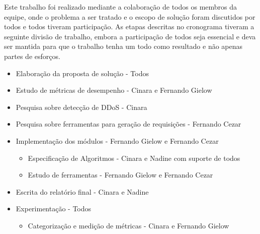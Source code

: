
Este trabalho foi realizado mediante a colaboração de todos os membros da equipe, onde o problema a ser tratado e o escopo de solução foram discutidos por todos e todos tiveram participação. As etapas descritas no cronograma tiveram a seguinte divisão de trabalho, embora a participação de todos seja essencial e deva ser mantida para que o trabalho tenha um todo como resultado e não apenas partes de esforços.


\begin{itemize}
\item Elaboração da proposta de solução - Todos
\item Estudo de métricas de desempenho - Cinara e Fernando Gielow
\item Pesquisa sobre detecção de DDoS - Cinara
\item Pesquisa sobre ferramentas para geração de requisições - Fernando Cezar
\item Implementação dos módulos - Fernando Gielow e Fernando Cezar
\begin{itemize}
\item Especificação de Algoritmos - Cinara e Nadine com suporte de todos
\item Estudo de ferramentas - Fernando Gielow e Fernando Cezar
\end{itemize}
\item Escrita do relatório final - Cinara e Nadine
\item Experimentação - Todos
\begin{itemize}
\item Categorização e medição de métricas - Cinara e Fernando Gielow
\end{itemize}

\end{itemize}


